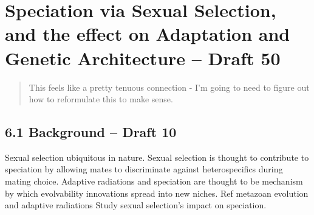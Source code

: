 \section{Speciation via Sexual Selection, and the effect on Adaptation and Genetic Architecture – Draft 50}

\begin{quote}
This feels like a pretty tenuous connection - I’m going to need to figure out how to reformulate this to make sense.
\end{quote}
\subsection{6.1 Background – Draft 10}

Sexual selection ubiquitous in nature.
Sexual selection is thought to contribute to speciation by allowing mates to discriminate against heterospecifics during mating choice.
Adaptive radiations and speciation are thought to be mechanism by which evolvability innovations spread into new niches.
Ref metazoan evolution and adaptive radiations
Study sexual selection’s impact on speciation.